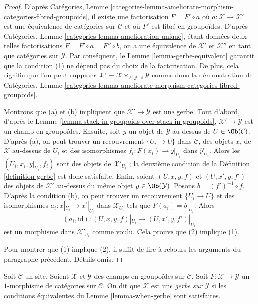 \begin{proof}
D'après
Catégories, Lemme
\ref{categories-lemma-ameliorate-morphism-categories-fibred-groupoids},
il existe une factorisation $F = F' \circ a$ où
$a : \mathcal{X} \to \mathcal{X}'$ est une équivalence de catégories sur
$\mathcal{C}$ et où $F'$ est fibré en groupoïdes. D'après
Catégories, Lemme \ref{categories-lemma-amelioration-unique},
étant données deux telles factorisations $F = F' \circ a = F'' \circ b$,
on a une équivalence de $\mathcal{X}'$ et $\mathcal{X}''$ en tant que
catégories sur $\mathcal{Y}$. Par conséquent, le
Lemme \ref{lemma-gerbe-equivalent}
garantit que la condition (1) ne dépend pas du choix de la
factorisation. De plus, cela signifie que l'on peut supposer
$\mathcal{X}' = \mathcal{X} \times_{F, \mathcal{Y}, \text{id}} \mathcal{Y}$
comme dans la démonstration de
Catégories, Lemme
\ref{categories-lemma-ameliorate-morphism-categories-fibred-groupoids}.

\medskip\noindent
Montrons que (a) et (b) impliquent que $\mathcal{X}' \to \mathcal{Y}$
est une gerbe. Tout d'abord, d'après le
Lemme \ref{lemma-stack-in-groupoids-over-stack-in-groupoids},
$\mathcal{X}' \to \mathcal{Y}$ est un champ en groupoïdes.
Ensuite, soit $y$ un objet de $\mathcal{Y}$ au-dessus de
$U \in \Ob(\mathcal{C})$. D'après (a), on peut trouver un recouvrement
$\{U_i \to U\}$ dans $\mathcal{C}$, des objets $x_i$ de $\mathcal{X}$
au-dessus de $U_i$ et des isomorphismes $f_i : F(x_i) \to y|_{U_i}$ dans
$\mathcal{Y}_{U_i}$. Alors les $(U_i, x_i, y|_{U_i}, f_i)$ sont des objets
de $\mathcal{X}'_{U_i}$ ; la deuxième condition de la
Définition \ref{definition-gerbe}
est donc satisfaite. Enfin, soient $(U, x, y, f)$ et $(U, x', y, f')$ des objets
de $\mathcal{X}'$ au-dessus du même objet $y \in \Ob(\mathcal{Y})$.
Posons $b = (f')^{-1} \circ f$. D'après la condition (b), on peut trouver un recouvrement
$\{U_i \to U\}$ et des isomorphismes $a_i : x|_{U_i} \to x'|_{U_i}$
dans $\mathcal{X}_{U_i}$ tels que $F(a_i) = b|_{U_i}$. Alors
$$
(a_i, \text{id}) : (U, x, y, f)|_{U_i} \to (U, x', y, f')|_{U_i}
$$
est un morphisme dans $\mathcal{X}'_{U_i}$ comme voulu. Cela prouve que
(2) implique (1).

\medskip\noindent
Pour montrer que (1) implique (2), il suffit de lire à rebours les arguments
du paragraphe précédent. Détails omis.
\end{proof}

\begin{definition}
\label{definition-gerbe-over-stack-in-groupoids}
Soit $\mathcal{C}$ un site. Soient $\mathcal{X}$
et $\mathcal{Y}$ des champs en groupoïdes sur $\mathcal{C}$.
Soit $F : \mathcal{X} \to \mathcal{Y}$ un $1$-morphisme de catégories
sur $\mathcal{C}$. On dit que $\mathcal{X}$ est une {\it gerbe sur} $\mathcal{Y}$
si les conditions équivalentes du
Lemme \ref{lemma-when-gerbe}
sont satisfaites.
\end{definition}

